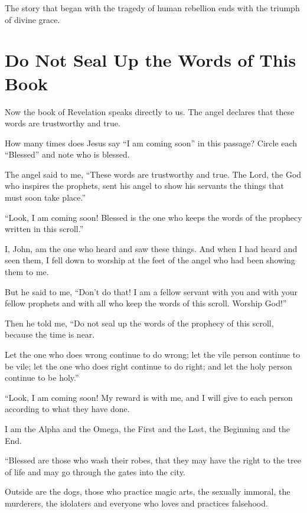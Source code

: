 The story that began with the tragedy of human rebellion ends with the triumph of divine grace.

\section{Do Not Seal Up the Words of This Book}

Now the book of Revelation speaks directly to us. The angel declares that these words are trustworthy and true. 

\begin{ScriptureBox2}{How many times does Jesus say ``I am coming soon'' in this passage? Circle each ``Blessed'' and note who is blessed.}

\item[22:6] The angel said to me, ``These words are trustworthy and true. The Lord, the God who inspires the prophets, sent his angel to show his servants the things that must soon take place.''

\item[22:7] ``Look, I am coming soon! Blessed is the one who keeps the words of the prophecy written in this scroll.''

\item[22:8] I, John, am the one who heard and saw these things. And when I had heard and seen them, I fell down to worship at the feet of the angel who had been showing them to me.

\item[22:9] But he said to me, ``Don't do that! I am a fellow servant with you and with your fellow prophets and with all who keep the words of this scroll. Worship God!''

\item[22:10] Then he told me, ``Do not seal up the words of the prophecy of this scroll, because the time is near.

\item[22:11] Let the one who does wrong continue to do wrong; let the vile person continue to be vile; let the one who does right continue to do right; and let the holy person continue to be holy.''

\item[22:12] ``Look, I am coming soon! My reward is with me, and I will give to each person according to what they have done.

\item[22:13] I am the Alpha and the Omega, the First and the Last, the Beginning and the End.

\item[22:14] ``Blessed are those who wash their robes, that they may have the right to the tree of life and may go through the gates into the city.

\item[22:15] Outside are the dogs, those who practice magic arts, the sexually immoral, the murderers, the idolaters and everyone who loves and practices falsehood.

\end{ScriptureBox2}

